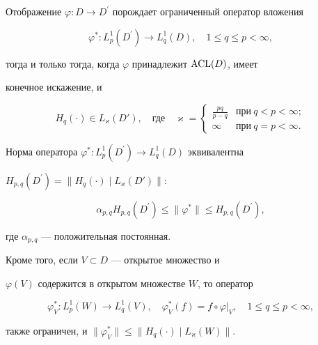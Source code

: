 \begin{thm}


Отображение $\varphi : D\to


D^{\prime}$ порождает ограниченный оператор вложения


$$


\varphi^{\ast} :


L^1_p(D^{\prime})\to L^1_q(D),\quad 1\leq q\leq p<\infty,


$$


тогда и только тогда, когда $\varphi$ принадлежит $\operatorname{ACL}(D)$, имеет


конечное искажение, и


$$


H_q(\cdot)\in


L_{\varkappa}(D'),


\quad\text{где}\quad \varkappa=


\begin{cases} \frac{pq}{p-q} & \text{при}\ q<p<\infty;\\


\infty & \text{при}\ q=p<\infty.


\end{cases}


$$


Норма оператора $\varphi^{*}


:L_{p}^{1}(D^{\prime})\to L_{q}^{1}(D)$ эквивалентна


$H_{p,q}(D^{\prime})=\|H_q(\cdot)\mid L_{\varkappa}(D')\|{:}$


$$


\alpha_{p,q}H_{p,q}(D^{\prime})\leq\|\varphi^{*}\|\leq


H_{p,q}(D^{\prime}),


$$


где $\alpha_{p,q}$ --- положительная постоянная.





Кроме того, если $V\subset D$ --- открытое множество и


$\varphi(V)$ содержится в открытом множестве $W$, то оператор


$$


\varphi_V^{\ast} : L^1_p(W)\to L^1_q(V),\quad


\varphi_V^{\ast}(f)=f\circ\varphi|_V, \quad 1\leq q\leq


p<\infty,


$$


также ограничен, и $\|\varphi_V^{\ast}\|\leq


\|H_q(\cdot)\mid L_{\varkappa}(W)\|$.


\end{thm}





